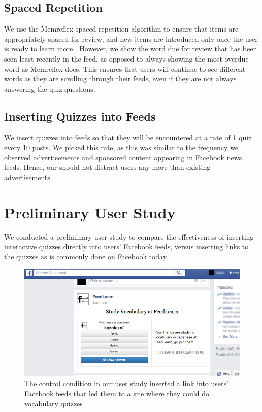 \documentclass{chi-ext}
\begin{document}
\subsection{Spaced Repetition}

We use the Memreflex spaced-repetition algorithm to ensure that items are appropriately spaced for review, and new items are introduced only once the user is ready to learn more \cite{memreflex}. However, we show the word due for review that has been seen least recently in the feed, as opposed to always showing the most overdue word as Memreflex does. This ensures that users will continue to see different words as they are scrolling through their feeds, even if they are not always answering the quiz questions.

\subsection{Inserting Quizzes into Feeds}

We insert quizzes into feeds so that they will be encountered at a rate of 1 quiz every 10 posts. We picked this rate, as this was similar to the frequency we observed advertisements and sponsored content appearing in Facebook news feeds. Hence, our should not distract users any more than existing advertisements. %

\section{Preliminary User Study}

We conducted a preliminary user study to compare the effectiveness of inserting interactive quizzes directly into users' Facebook feeds, versus inserting links to the quizzes as is commonly done on Facebook today. %

\begin{figure}
\centering
\includegraphics[width=1.0\columnwidth]{feedlearn-link-screenshot}
\caption{The control condition in our user study inserted a link into users' Facebook feeds that led them to a site where they could do vocabulary quizzes}
\label{fig:control}
\end{figure}
\end{document}
